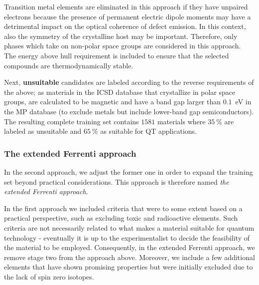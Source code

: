 \documentclass[superscriptaddress,unsortedaddress,
 amsmath,amssymb,
 aps,
]{revtex4-2}
\begin{document}
Transition metal elements are eliminated in this approach if they have unpaired electrons because the presence of permanent electric dipole moments may have a detrimental impact on the optical coherence of defect emission. In this context, also the symmetry of the crystalline host may be important. Therefore, only phases which take on non-polar space groups are considered in this approach. 
The energy above hull requirement is included to ensure that the selected compounds are thermodynamically stable. 

Next, \textbf{unsuitable} candidates are labeled according to the reverse requirements of the above; as materials in the ICSD database \cite{Allen1987,Zagorac2019} 
that crystallize in polar space groups, are calculated to be magnetic and have a band gap larger than $0.1$~eV in the MP database (to exclude metals but include lower-band gap semiconductors). 
The resulting complete training set contains $1581$ materials where $35 \ \%$
are labeled as unsuitable and 
$65 \ \%$ as suitable for QT applications.  


\subsubsection*{The extended Ferrenti approach}
In the second approach, we adjust the former one in order to expand the training set beyond practical considerations. This approach is therefore named \emph{the extended Ferrenti approach}. 

In the first approach we included criteria that were 
to some extent based on a practical perspective, such as excluding toxic and radioactive elements. Such criteria are not necessarily related to what makes a material suitable for quantum technology - eventually it is up to the experimentalist to decide the feasibility of the material to be employed. 
Consequently, in the extended Ferrenti approach, we remove stage two from the approach above. Moreover, we include a few additional elements that have shown promising properties but were initially excluded due to the lack of spin zero isotopes. 
\end{document}
